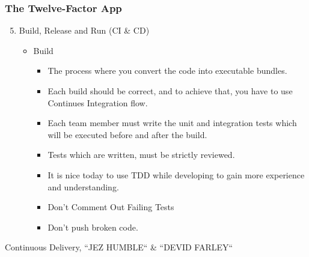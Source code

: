\documentclass{beamer}
\begin{document}
		\begin{frame}
		\frametitle{The Twelve-Factor App}
			\begin{enumerate}
				\setcounter{enumi}{4}
				\item Build, Release and Run (CI \& CD) \\
				\vspace{2mm}
				\begin{itemize}
					\item {Build}
						\begin{itemize}
							\item<1-> \scriptsize {The process where you convert the code into executable bundles}.
							\vspace{2mm}
							\item<2-> \scriptsize {Each build should be correct, and to achieve that, you have to use Continues Integration flow}.\vspace{2mm}
							\item<3-> \scriptsize {Each team member must write the unit and integration tests which will be executed before and after the build}.\vspace{2mm}
							\item<4-> \scriptsize {Tests which are written, must be strictly reviewed}.
							\vspace{2mm}
							\item<5-> \scriptsize {It is nice today to use TDD while developing to gain more experience and understanding}.
							\vspace{2mm}
							\item<6-> \scriptsize {\color{red} Don’t Comment Out Failing Tests}
							\vspace{2mm}
							\item<7-> \scriptsize {\color{red} Don't push broken code}.
						\end{itemize}
				\end{itemize}
			\end{enumerate}
		\vspace{20mm}
		\tiny{Continuous Delivery, ``JEZ HUMBLE`` \& ``DEVID FARLEY``}	
		\end{frame}
	
\end{document}
